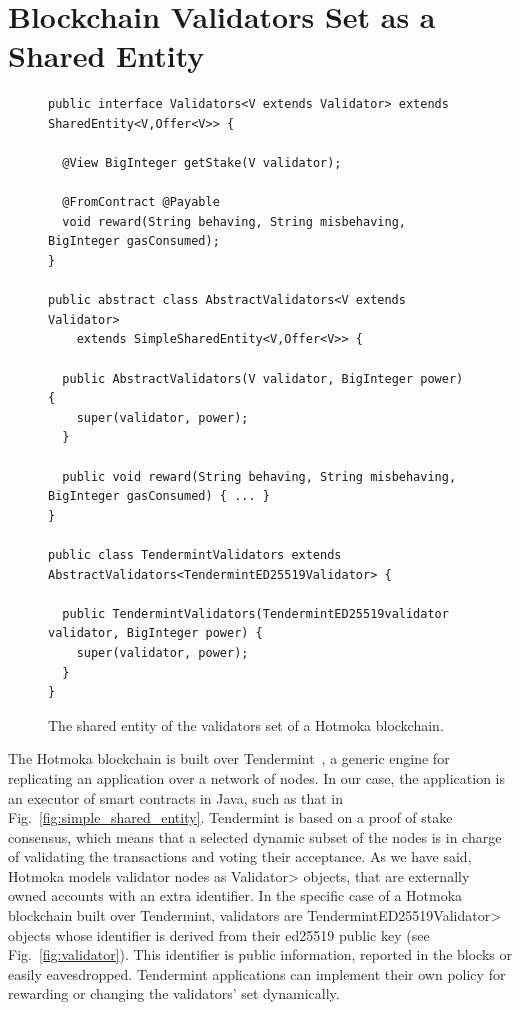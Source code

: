 \section{Blockchain Validators Set as a Shared Entity}\label{sec:validators}





\begin{figure}[t]
  \begin{center}
    \begin{lstlisting}[language=Takamaka]
public interface Validators<V extends Validator> extends SharedEntity<V,Offer<V>> {

  @View BigInteger getStake(V validator);

  @FromContract @Payable
  void reward(String behaving, String misbehaving, BigInteger gasConsumed);
}

public abstract class AbstractValidators<V extends Validator>
    extends SimpleSharedEntity<V,Offer<V>> {

  public AbstractValidators(V validator, BigInteger power) {
    super(validator, power);
  }

  public void reward(String behaving, String misbehaving, BigInteger gasConsumed) { ... }
}

public class TendermintValidators extends AbstractValidators<TendermintED25519Validator> {

  public TendermintValidators(TendermintED25519validator validator, BigInteger power) {
    super(validator, power);
  }
}
    \end{lstlisting}
  \end{center}
  \caption{The shared entity of the validators set of a Hotmoka blockchain.}\label{fig:validators}
\end{figure}

The Hotmoka blockchain is built over Tendermint~\cite{Kwon14}, a
generic engine for replicating an application over a network of nodes. In our case,
the application is an executor of smart contracts in Java, such as that in
Fig.~\ref{fig:simple_shared_entity}. Tendermint is based on a proof of stake
consensus, which means that a selected dynamic subset of the nodes is in charge of
validating the transactions and voting their acceptance. 
As we have said,
Hotmoka models validator nodes as \<Validator> objects, that are externally owned accounts
with an extra identifier. In the specific case of a Hotmoka blockchain built over Tendermint,
validators are \<TendermintED25519Validator> objects whose
identifier is derived from their ed25519 public key (see Fig.~\ref{fig:validator}).
This identifier is public information, reported in the blocks or easily eavesdropped.
Tendermint applications can implement their own
policy for rewarding or changing the validators' set dynamically.

